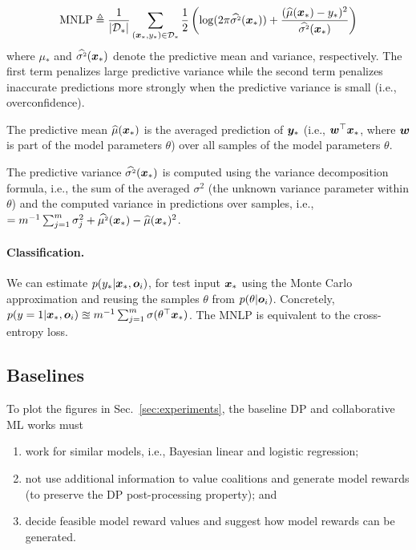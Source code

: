 \documentclass{article}
\theoremstyle{plain}
\theoremstyle{definition}
\theoremstyle{remark}
\begin{document}
\begin{equation*}
\text{MNLP} \triangleq \displaystyle \frac{1}{|{\mathcal{D}}_*|} \sum_{({\bm{x}}_*, y_*) \in {\mathcal{D}}_*} 
 {\frac{1}{2} \left( \log(2 \pi \widehat{\sigma^{\scriptscriptstyle 2}}({\bm{x}}_*)) + \frac{(\widehat{\mu}({\bm{x}}_*) - y_*)^2}{\widehat{\sigma^{\scriptscriptstyle 2}}({\bm{x}}_*)} \right)}
\end{equation*}
where $\mu_*$ and $\widehat{\sigma^{\scriptscriptstyle 2}}({\bm{x}}_*)$ denote the predictive mean and variance, respectively. 
The first term penalizes large predictive variance while the second term penalizes inaccurate predictions
more strongly when the predictive variance is small (i.e., overconfidence).
\squishlisttwo
\item The predictive mean $\widehat{\mu}({\bm{x}}_*)$ is the averaged prediction of ${\bm{y}}_*$ (i.e., ${\bm{w}}^\top {\bm{x}}_*$, where ${\bm{w}}$ is part of the model parameters $\theta$) over all samples of the model parameters  $\theta$.
\item The predictive variance  $\widehat{\sigma^{\scriptscriptstyle 2}}({\bm{x}}_*)$ is computed using the variance decomposition formula, i.e., the sum of the averaged $\sigma^2$ (the unknown variance parameter within $\theta$) and the computed variance in predictions over samples, i.e., $ = m^{-1} \sum^m_{j=1}\sigma_j^2 + \widehat{\mu^{\scriptscriptstyle 2}}({\bm{x}}_*) - \widehat{\mu}({\bm{x}}_*)^2$. 
\squishend

\paragraph{Classification.} We can estimate $p(y_* |{\bm{x}}_*, {\bm{o}}_i)$, for test input ${\bm{x}}_*$ using the Monte Carlo approximation \cite{murphy2022probabilistic} and reusing the samples $\theta$ from $p(\theta| {\bm{o}}_i)$. Concretely, $p(y=1|{\bm{x}}_*, {\bm{o}}_i) \approxeq m^{-1} \sum^m_{j=1} \sigma(\theta^\top {\bm{x}}_*)$. The MNLP is equivalent to the cross-entropy loss. 

\subsection{Baselines}\label{app:exp-baselines}
 To plot the figures in Sec.~\ref{sec:experiments}, the baseline DP and collaborative ML works must 
\begin{enumerate}[noitemsep,topsep=0pt]
    \item work for similar models, i.e., Bayesian linear and logistic regression;
    \item not use additional information to value coalitions and generate model rewards (to preserve the DP post-processing property); and
    \item decide feasible model reward values and suggest how model rewards can be generated. 
\end{enumerate}
\end{document}
